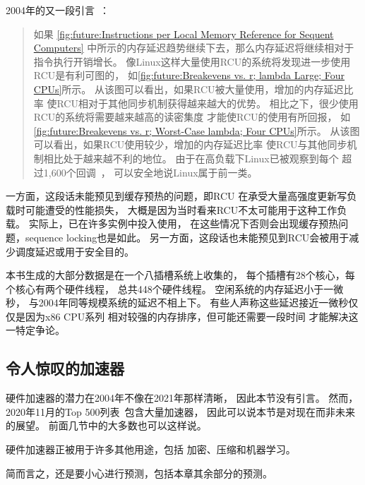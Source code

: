 2004年的又一段引言~\cite{PaulEdwardMcKenneyPhD}：

\begin{quote}
	如果
	\cref{fig:future:Instructions per Local Memory Reference for Sequent Computers}
	中所示的内存延迟趋势继续下去，那么内存延迟将继续相对于
	指令执行开销增长。
	像Linux这样大量使用RCU的系统将发现进一步使用RCU是有利可图的，
	如\cref{fig:future:Breakevens vs. r; lambda Large; Four CPUs}所示。
	从该图可以看出，如果RCU被大量使用，增加的内存延迟比率
	使RCU相对于其他同步机制获得越来越大的优势。
	相比之下，很少使用RCU的系统将需要越来越高的读密集度
	才能使RCU的使用有所回报，
	如\cref{fig:future:Breakevens vs. r; Worst-Case lambda; Four CPUs}所示。
	从该图可以看出，如果RCU使用较少，增加的内存延迟比率
	使RCU与其他同步机制相比处于越来越不利的地位。
	由于在高负载下Linux已被观察到每个
	超过1,600个回调~\cite{Sarma04c}，
	可以安全地说Linux属于前一类。
\end{quote}

一方面，这段话未能预见到缓存预热的问题，即RCU
在承受大量高强度更新写负载时可能遭受的性能损失，
大概是因为当时看来RCU不太可能用于这种工作负载。
实际上，已在许多实例中投入使用，
在这些情况下否则会出现缓存预热问题，sequence locking也是如此。
另一方面，这段话也未能预见到RCU会被用于减少调度延迟或用于安全目的。

本书生成的大部分数据是在一个八插槽系统上收集的，
每个插槽有28个核心，每个核心有两个硬件线程，
总共448个硬件线程。
空闲系统的内存延迟小于一微秒，
与2004年同等规模系统的延迟不相上下。
有些人声称这些延迟接近一微秒仅仅是因为x86 CPU系列
相对较强的内存排序，但可能还需要一段时间
才能解决这一特定争论。

\subsection{令人惊叹的加速器}
\label{sec:future:Astounding Accelerators}

硬件加速器的潜力在2004年不像在2021年那样清晰，
因此本节没有引言。
然而，2020年11月的Top 500列表~\cite{Top500}包含大量加速器，
因此可以说本节是对现在而非未来的展望。
前面几节中的大多数也可以这样说。

硬件加速器正被用于许多其他用途，包括
加密、压缩和机器学习。

简而言之，还是要小心进行预测，包括本章其余部分的预测。
